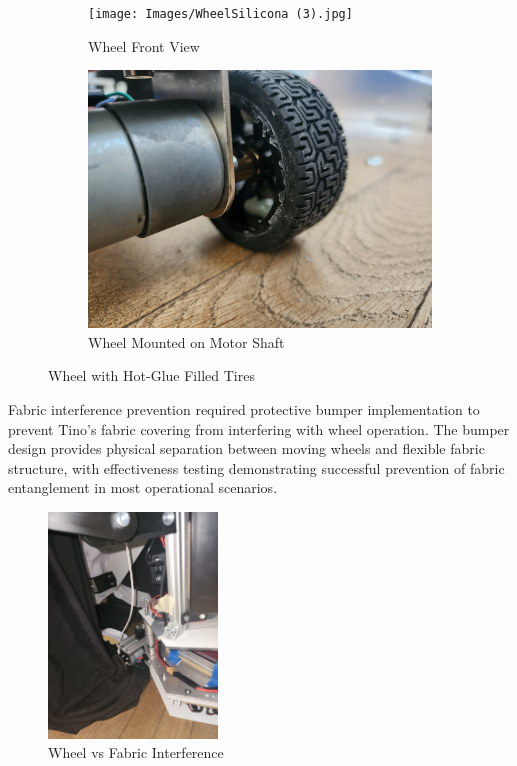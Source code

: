 \begin{figure}[H]
    \centering
    \begin{subfigure}{0.45\textwidth}
        \centering
        \texttt{[image: Images/WheelSilicona (3).jpg]}
        \caption{Wheel Front View}
        \label{fig:wheel_hotglue}
    \end{subfigure}
    \hfill
    \begin{subfigure}{0.45\textwidth}
        \centering
        \includegraphics[width=\textwidth]{Images/WheelSilicona.jpg}
        \caption{Wheel Mounted on Motor Shaft}
        \label{fig:wheel_silicone}
    \end{subfigure}
    \caption{Wheel with Hot-Glue Filled Tires}
    \label{fig:combined}
\end{figure}

Fabric interference prevention required protective bumper implementation to prevent Tino's fabric covering from interfering with wheel operation. The bumper design provides physical separation between moving wheels and flexible fabric structure, with effectiveness testing demonstrating successful prevention of fabric entanglement in most operational scenarios.

\begin{figure}[H]
    \centering
    \includegraphics[height=6cm,angle=-90]{Images/WheelVSFabric (2).jpg}
    \caption{Wheel vs Fabric Interference}
    \label{fig:wheel_vs_fabric}
\end{figure}

